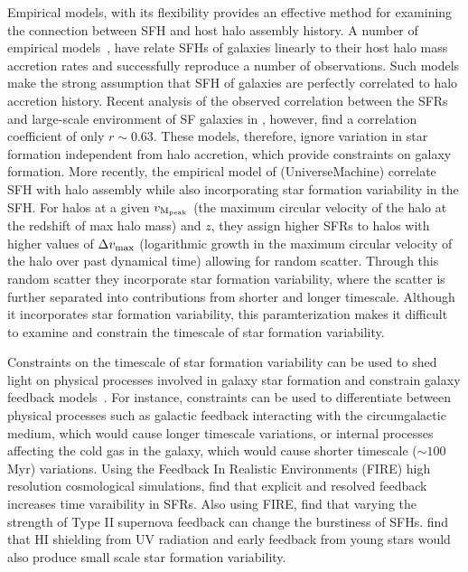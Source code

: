 \documentclass[12pt, letterpaper, preprint, tighten]{aastex62}
\begin{document}
Empirical models, with its flexibility provides an effective method for
examining the connection between SFH and host halo assembly history. A 
number of empirical models~\citep{taghizadeh-popp2015, becker2015, rodriguez-puebla2016a, mitra2017, cohn2017, moster2017}, 
have relate SFHs of galaxies linearly to their host halo mass accretion 
rates and successfully reproduce a number of observations. Such models 
make the strong assumption that SFH of galaxies are perfectly correlated 
to halo accretion history. Recent analysis of the observed correlation 
between the SFRs and large-scale environment of SF galaxies in \cite{tinker2018b}, 
however, find a correlation coefficient of only $r \sim 0.63$. These models, 
therefore, ignore variation in star formation independent from halo accretion, 
which provide constraints on galaxy formation. More recently, the empirical
model of \cite{behroozi2018} ({\sc UniverseMachine}) correlate SFH 
with halo assembly while also incorporating star formation variability in 
the SFH. For halos at a given $v_{\rm M_{peak}}$ (the maximum circular 
velocity of the halo at the redshift of max halo mass) and $z$, they 
assign higher SFRs to halos with higher values of $\Delta v_{\rm max}$ 
(logarithmic growth in the maximum circular velocity of the halo over past dynamical time)
allowing for random scatter. Through this random scatter they incorporate 
star formation variability, where the scatter is further separated into 
contributions from shorter and longer timescale. Although it incorporates 
star formation variability, this paramterization makes it difficult to 
examine and constrain the timescale of star formation variability. 

Constraints on the timescale of star formation variability can be used to 
shed light on physical processes involved in galaxy star formation and 
constrain galaxy feedback models~\citep{sparre2015}. For instance, 
constraints can be used to differentiate between physical processes such 
as galactic feedback interacting with the circumgalactic medium, which 
would cause longer timescale variations, or internal processes affecting 
the cold gas in the galaxy, which would cause shorter timescale 
($\sim 100$ Myr) variations. Using the Feedback In Realistic Environments (FIRE) 
high resolution cosmological simulations, \cite{hopkins2014} find that 
explicit and resolved feedback increases time varaibility in SFRs. 
Also using FIRE, \cite{sparre2017} find that varying the strength of 
Type II supernova feedback can change the burstiness of SFHs. 
\cite{governato2015} find that HI shielding from UV radiation and 
early feedback from young stars would also produce small scale star 
formation variability.
\end{document}
